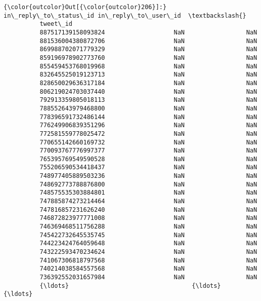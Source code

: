 \documentclass[11pt]{article}
\begin{document}
\begin{Verbatim}[commandchars=\\\{\}]
{\color{outcolor}Out[{\color{outcolor}206}]:}                    in\_reply\_to\_status\_id in\_reply\_to\_user\_id  \textbackslash{}
          tweet\_id                                                       
          887517139158093824                   NaN                 NaN   
          881536004380872706                   NaN                 NaN   
          869988702071779329                   NaN                 NaN   
          859196978902773760                   NaN                 NaN   
          855459453768019968                   NaN                 NaN   
          832645525019123713                   NaN                 NaN   
          828650029636317184                   NaN                 NaN   
          806219024703037440                   NaN                 NaN   
          792913359805018113                   NaN                 NaN   
          788552643979468800                   NaN                 NaN   
          778396591732486144                   NaN                 NaN   
          776249906839351296                   NaN                 NaN   
          772581559778025472                   NaN                 NaN   
          770655142660169732                   NaN                 NaN   
          770093767776997377                   NaN                 NaN   
          765395769549590528                   NaN                 NaN   
          755206590534418437                   NaN                 NaN   
          748977405889503236                   NaN                 NaN   
          748692773788876800                   NaN                 NaN   
          748575535303884801                   NaN                 NaN   
          747885874273214464                   NaN                 NaN   
          747816857231626240                   NaN                 NaN   
          746872823977771008                   NaN                 NaN   
          746369468511756288                   NaN                 NaN   
          745422732645535745                   NaN                 NaN   
          744223424764059648                   NaN                 NaN   
          743222593470234624                   NaN                 NaN   
          741067306818797568                   NaN                 NaN   
          740214038584557568                   NaN                 NaN   
          736392552031657984                   NaN                 NaN   
          {\ldots}                                  {\ldots}                 {\ldots}   

\end{Verbatim}
\end{document}
